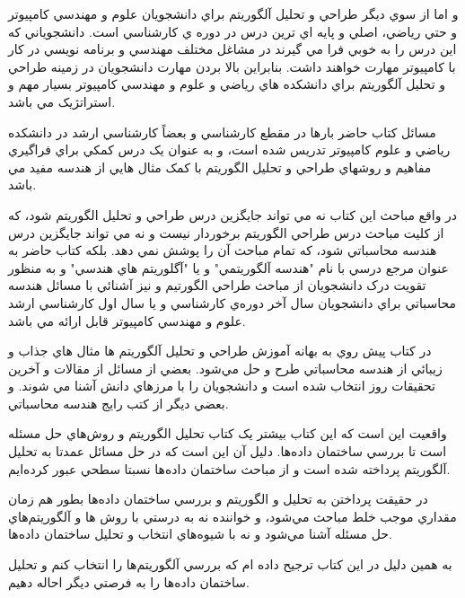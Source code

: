 \documentclass{book}
\begin{document}
	\begin{flushright}
	و اما از سوي ديگر طراحي و تحليل آلگوريتم براي دانشجويان علوم و مهندسي کامپيوتر و حتي رياضي، اصلي و پايه اي ترين درس در دوره ي کارشناسي است. دانشجوياني که اين درس را به خوبي فرا مي گيرند در مشاغل مختلف مهندسي و برنامه نويسي در کار با کامپيوتر مهارت خواهند داشت. بنابراين بالا بردن مهارت دانشجويان در زمينه طراحي و تحليل آلگوريتم براي دانشکده هاي رياضي و علوم و مهندسي کامپيوتر بسيار مهم و استراتژيک مي باشد.\\
\end{flushright}
	\begin{flushright}
	مسائل کتاب حاضر بارها در مقطع کارشناسي و بعضاً کارشناسي ارشد در دانشکده رياضي و علوم کامپيوتر تدريس شده است، و به عنوان يک درس کمکي براي فراگيري مفاهيم و روشهاي طراحي و تحليل الگوريتم با کمک مثال هايي از هندسه مفيد مي باشد.\\
\end{flushright}
	\begin{flushright}
	
	در واقع مباحث اين کتاب نه مي تواند جايگزين درس طراحي و تحليل الگوريتم شود، که از کليت مباحث درس طراحي الگوريتم برخوردار نيست و نه مي تواند جايگزين درس هندسه محاسباتي شود، که تمام مباحث آن را پوشش نمي دهد. بلکه کتاب حاضر به عنوان مرجع درسي با نام "هندسه آلگوريتمي" و يا "آگلوريتم هاي هندسي" و به منظور تقويت درک دانشجويان از مباحث طراحي الگورتيم  و نيز آشنائي با مسائل هندسه محاسباتي براي دانشجويان سال آخر دوره‌ي کارشناسي و يا سال اول کارشناسي ارشد علوم و مهندسي کامپيوتر قابل ارائه مي باشد.\\
\end{flushright}
	\begin{flushright}
		در کتاب پيش روي به بهانه آموزش طراحي و تحليل آلگوريتم ها مثال هاي جذاب و زيبائي از هندسه محاسباتي طرح و حل مي‌شود. بعضي از مسائل از مقالات و آخرين تحقيقات روز انتخاب شده است و دانشجويان را با مرزهاي دانش آشنا مي شوند. و بعضي ديگر از کتب رايج هندسه محاسباتي.
\end{flushright}
	\begin{flushright}
		واقعيت اين است که اين کتاب بيشتر يک کتاب تحليل الگوريتم و روش‌هاي حل مسئله است تا بررسي ساختمان داده‌ها. دليل آن اين است که در حل مسائل عمدتا به تحليل آلگوريتم پرداخته شده است و از مباحث ساختمان داده‌ها نسبتا سطحي عبور کرده‌ايم.
\end{flushright}
	\begin{flushright}
	در حقيقت پرداختن به تحليل و الگوريتم و بررسي ساختمان داده‌ها بطور هم زمان مقداري موجب خلط مباحث مي‌شود، و خواننده نه به درستي با روش ها و آلگوريتم‌هاي حل مسئله آشنا مي‌شود و نه با شيوه‌هاي انتخاب و تحليل ساختمان داده‌ها.
\end{flushright}
	\begin{flushright}
		به همين دليل در اين کتاب ترجيح داده ام که بررسي آلگوريتم‌ها را انتخاب کنم و تحليل ساختمان داده‌ها را به فرصتي ديگر احاله دهيم.
\end{flushright}
\end{document}
